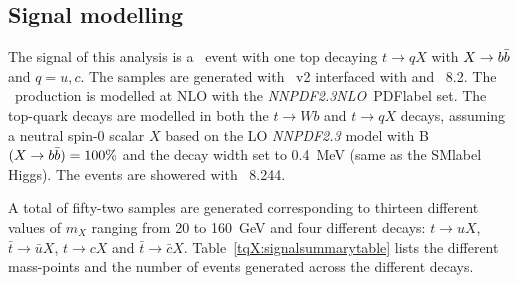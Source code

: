 

\subsection{Signal modelling}

The signal of this analysis is a \ttbar\ event with one top decaying $t\to qX$ with $X\to b\bar{b}$ and $q=u,c$. The samples are generated with \POWHEGBOX~v2 interfaced with \MADSPIN and \PYTHIA~8.2. The \ttbar\ production is modelled at NLO with the \textit{NNPDF2.3NLO}~\acrshort{PDFlabel} set. The top-quark decays are modelled in \MADSPIN both the $t\to Wb$ and $t\to qX$ decays, assuming a neutral spin-0 scalar $X$ based on the LO \textit{NNPDF2.3}  model with B$(X\to b\bar{b})=100\%$ and the decay width set to 0.4~MeV (same as the \acrshort{SMlabel} Higgs). The events are showered with \PYTHIA~8.244.

A total of fifty-two samples are generated corresponding to thirteen different values of $m_X$ ranging from 20 to 160~GeV and four different decays: $t\to uX$, $\bar{t}\to \bar{u}X$, $t\to cX$ and $\bar{t}\to \bar{c}X$. Table~\ref{tqX:signalsummarytable} lists the different mass-points and the number of events generated across the different decays. 

